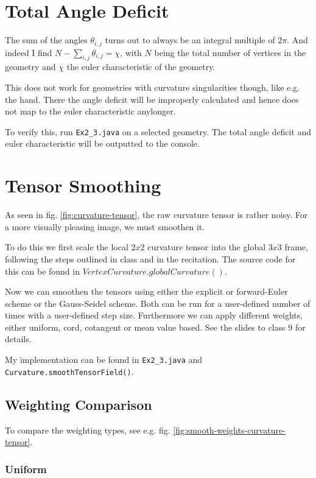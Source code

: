 \documentclass[a4paper,10pt,notitlepage]{scrreprt}
\begin{document}
\section{Total Angle Deficit}

The sum of the angles $\theta_{i,j}$ turns out to always be an integral multiple
of $2 \pi$. And indeed I find $N - \sum_{i,j} \theta_{i,j} = \chi$, with $N$
being the total number of vertices in the geometry and $\chi$ the euler
characteristic of the geometry.

This does not work for geometries with curvature singularities
though, like e.g. the hand. There the angle deficit will be
improperly calculated and hence does not map to the euler
characteristic anylonger.

To verify this, run \texttt{Ex2\_3.java} on a selected geometry. The total angle
deficit and euler characteristic will be outputted to the console.

\pagebreak

\section{Tensor Smoothing}

As seen in fig. \ref{fig:curvature-tensor}, the raw curvature tensor is rather
noisy. For a more visually pleasing image, we must smoothen it.

To do this we first scale the local $2x2$ curvature tensor into the global
$3x3$ frame, following the steps outlined in class and in the recitation. The
source code for this can be found in $VertexCurvature.globalCurvature()$.

Now we can smoothen the tensors using either the explicit or forward-Euler
scheme or the Gauss-Seidel scheme. Both can be run for a user-defined number of
times with a user-defined step size. Furthermore we can apply different
weights, either uniform, cord, cotangent or mean value based. See the slides to
class 9 for details.

My implementation can be found in \texttt{Ex2\_3.java} and
\texttt{Curvature.smoothTensorField()}.

\subsection{Weighting Comparison}

To compare the weighting types, see e.g. fig.
\ref{fig:smooth-weights-curvature-tensor}.

\subsubsection{Uniform}
\end{document}
